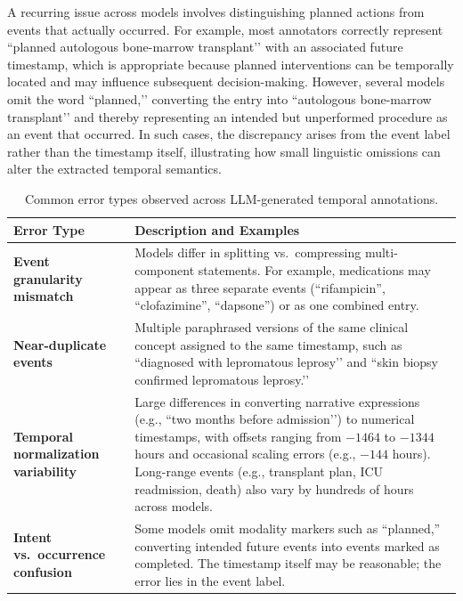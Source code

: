 \documentclass[pdflatex,sn-mathphys-num]{sn-jnl}%
\theoremstyle{thmstyleone}%
\theoremstyle{thmstyletwo}%
\theoremstyle{thmstylethree}%
\begin{document}
A recurring issue across models involves distinguishing planned actions from events that actually occurred. For example, most annotators correctly represent “planned autologous bone-marrow transplant’’ with an associated future timestamp, which is appropriate because planned interventions can be temporally located and may influence subsequent decision-making. However, several models omit the word “planned,’’ converting the entry into “autologous
bone-marrow transplant’’ and thereby representing an intended but unperformed procedure as an event that occurred. In such cases, the discrepancy arises from the event label rather than the timestamp itself, illustrating how small linguistic omissions can alter the extracted temporal semantics.
\begin{table}[h!]
\centering
\caption{Common error types observed across LLM-generated temporal annotations.}
\label{tab:error_taxonomy}
\begin{tabular}{p{3.2cm} p{9cm}}
\toprule
\textbf{Error Type} & \textbf{Description and Examples} \\
\midrule

\textbf{Event granularity mismatch} 
& Models differ in splitting vs.\ compressing multi-component statements. 
For example, medications may appear as three separate events (``rifampicin'', ``clofazimine'', ``dapsone'') or as one combined entry. \\[6pt]

\textbf{Near-duplicate events} 
& Multiple paraphrased versions of the same clinical concept assigned to the same timestamp, such as 
``diagnosed with lepromatous leprosy’’ and 
``skin biopsy confirmed lepromatous leprosy.’’ \\[6pt]

\textbf{Temporal normalization variability} 
& Large differences in converting narrative expressions (e.g., ``two months before admission’’) to numerical timestamps, with offsets ranging from $-1464$ to $-1344$ hours and occasional scaling errors (e.g., $-144$ hours). Long-range events (e.g., transplant plan, ICU readmission, death) also vary by hundreds of hours across models. \\[6pt]

\textbf{Intent vs.\ occurrence confusion} 
& Some models omit modality markers such as ``planned,'' converting intended future events into events marked as completed. 
The timestamp itself may be reasonable; the error lies in the event label. \\[6pt]


\end{tabular}
\end{table}
\end{document}
